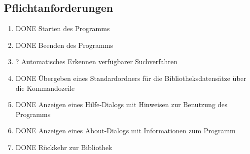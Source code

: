 \subsection{Pflichtanforderungen}
\begin{enumerate} [label=\bfseries /F \arabic*0/, leftmargin=*]
	\item DONE Starten des Programms
	\item DONE Beenden des Programms
	\item ? Automatisches Erkennen verfügbarer Suchverfahren
	\item DONE Übergeben eines Standardordners für die Bibliotheksdatensätze über die Kommandozeile
	\item DONE Anzeigen eines Hilfe-Dialogs mit Hinweisen zur Benutzung des Programms
	\item DONE Anzeigen eines About-Dialogs mit Informationen zum Programm
	\item DONE Rückkehr zur Bibliothek
	\newline
 

\end{enumerate}
